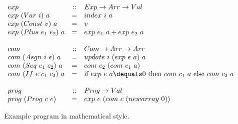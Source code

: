 \begin{figure}
\figrule
\programmath
\[
\begin{array}{lcl}
exp                   & :: & Exp \rightarrow Arr \rightarrow Val \\
exp~(Var~i)~a         & =  & index~i~a \\
exp~(Const~v)~a       & =  & v \\
exp~(Plus~e_1~e_2)~a  & =  & exp~e_1~a+exp~e_2~a \\
\\
com                   & :: & Com \rightarrow Arr \rightarrow Arr \\
com~(Asgn~i~e)~a      & =  & update~i~(exp~e~a)~a \\
com~(Seq~c_1~c_2)~a   & =  & com~c_2~(com~c_1~a) \\
com~(If~e~c_1~c_2)~a  & =  & \textrm{if } exp~e~a \dequals 0 \textrm{ then }
                                      com~c_1~a \textrm{ else } com~c_2~a \\
\\
prog                  & :: & Prog \rightarrow Val\\
prog~(Prog~c~e)       & =  & exp~e~(com~c~(newarray~0))
\end{array}
\]
\unprogrammath
\caption{Example program in mathematical style.}\label{mathfigure}
\figrule
\end{figure}
